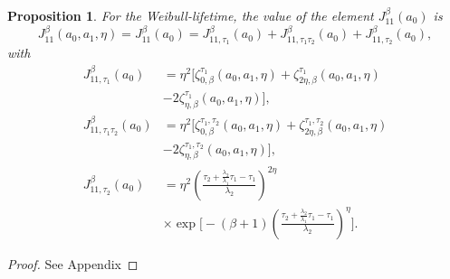 \documentclass{article}
\newtheorem{proposition}[theorem]{Proposition}
\begin{document}
\begin{proposition}\label{thm:asympa0}
For the Weibull-lifetime, the value of the element $J_{11}^{\beta}(a_0)$ is
\begin{equation*}
J_{11}^{\beta}(a_0,a_1,\eta) = J_{11}^{\beta}(a_0)=J_{11,\tau_1}^{\beta}(a_0)+J_{11,\tau_1\tau_2}^{\beta}(a_0)+J_{11,\tau_2}^{\beta}(a_0),
\end{equation*}
with
\begin{equation}
\begin{aligned}
J_{11,\tau_1}^{\beta}(a_0)
&=\eta^2\Big[
\zeta_{0,\beta}^{\tau_1}(a_0,a_1,\eta)
+\zeta_{2\eta,\beta}^{\tau_1}(a_0,a_1,\eta)
\\
&-2\zeta_{\eta,\beta}^{\tau_1}(a_0,a_1,\eta)
\Big],
\\
J_{11,\tau_1\tau_2}^{\beta}(a_0)
&=\eta^{2}\Big[
\zeta_{0,\beta}^{\tau_1,\tau_2}(a_0,a_1,\eta)
+\zeta_{2\eta,\beta}^{\tau_1,\tau_2}(a_0,a_1,\eta)
\\
&-2\zeta_{\eta,\beta}^{\tau_1,\tau_2}(a_0,a_1,\eta)
\Big],
\\
J_{11,\tau_2}^{\beta}(a_0)
&=\eta^2
\left(
\frac{\tau_2+\frac{\lambda_2}{\lambda_1}\tau_1-\tau_1}{\lambda_2}
\right)^{2\eta}
\\
&\times
\exp\!\Bigg[
-(\beta+1)
\left(
\frac{\tau_2+\frac{\lambda_2}{\lambda_1}\tau_1-\tau_1}{\lambda_2}
\right)^{\eta}
\Bigg].
\end{aligned}  \nonumber
\end{equation}

\end{proposition}
\begin{proof}
See Appendix
\end{proof}
\end{document}

